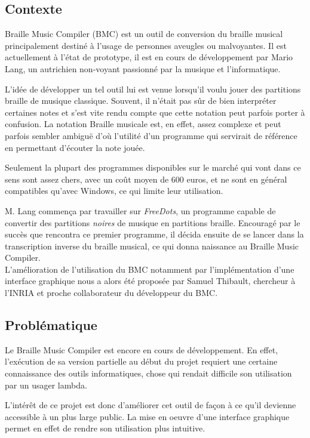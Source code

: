 \subsection*{Contexte}
Braille Music Compiler (BMC) est un outil de conversion du braille
musical principalement destiné à l'usage de personnes aveugles ou
malvoyantes. Il est actuellement à l'état de prototype, il est en
cours de développement par Mario Lang, un autrichien non-voyant
passionné par la musique et l'informatique.

L'idée de développer un tel outil lui est venue lorsqu'il voulu jouer
des partitions braille de musique classique. Souvent, il n'était pas
sûr de bien interpréter certaines notes et s'est vite rendu compte que
cette notation peut parfois porter à confusion. La notation Braille
musicale est, en effet, assez complexe et peut parfois sembler ambiguë
d'où l'utilité d'un programme qui servirait de référence en permettant
d'écouter la note jouée.
  
Seulement la plupart des programmes disponibles sur le marché qui vont
dans ce sens sont assez chers, avec un coût moyen de 600 euros, et ne
sont en général compatibles qu'avec Windows, ce qui limite leur
utilisation.
 
M. Lang commença par travailler sur \textit{FreeDots}, un programme
capable de convertir des partitions \textit{noires} de musique en
partitions braille. Encouragé par le succès que rencontra ce premier
programme, il décida ensuite de se lancer dans la transcription
inverse du braille musical, ce qui donna naissance au Braille Music
Compiler. \\
  
L'amélioration de l'utilisation du BMC notamment par l'implémentation
d'une interface graphique nous a alors été proposée par Samuel
Thibault, chercheur à l'INRIA et proche collaborateur du développeur
du BMC.
  
  
 
\subsection*{Problématique}
Le Braille Music Compiler est encore en cours de développement. En
effet, l'exécution de sa version partielle au début du projet requiert
une certaine connaissance des outils informatiques, chose qui rendait
difficile son utilisation par un usager lambda.

L'intérêt de ce projet est donc d'améliorer cet outil de façon à ce
qu'il devienne accessible à un plus large public. La mise en oeuvre
d'une interface graphique permet en effet de rendre son utilisation
plus intuitive.

